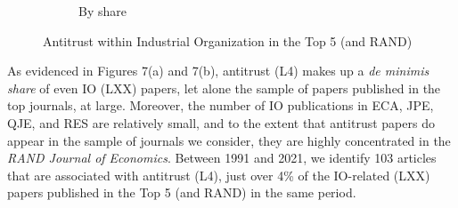 \documentclass[11pt, letterpaper, twoside]{article}
\begin{document}
\begin{figure}[!ht]
\begin{subfigure}[h]{0.49\textwidth}
        \caption{By share}
    \end{subfigure}
    \caption{Antitrust within Industrial Organization in the Top 5 (and RAND)}
\end{figure}

As evidenced in Figures 7(a) and 7(b), antitrust (L4) makes up a \textit{de minimis share} of even IO (LXX) papers, let alone the sample of papers published in the top journals, at large. Moreover, the number of IO publications in ECA, JPE, QJE, and RES are relatively small, and to the extent that antitrust papers do appear in the sample of journals we consider, they are highly concentrated in the \textit{RAND Journal of Economics}. Between 1991 and 2021, we identify 103 articles that are associated with antitrust (L4), just over 4\% of the IO-related (LXX) papers published in the Top 5 (and RAND) in the same period.
\end{document}
